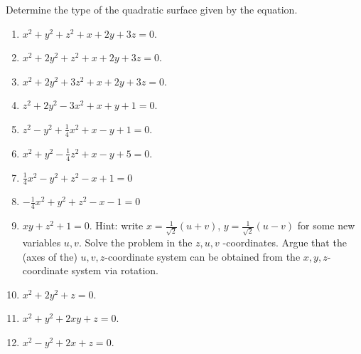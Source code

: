 Determine the type of the quadratic surface given by the equation.
\begin{enumerate}
\item 
$x^2 +y^2+z^2+x+2y+3z=0$.
\item $x^2 +2y^2+z^2+x+2y+3z=0$.
\item $x^2 +2y^2+3z^2+x+2y+3z=0$.
\item \label{problemTypeOfSurfacez^2+2y^2-3x^2+x+y+1=0} $z^2+2y^2-3x^2 + x+y+1=0 $.
\item $z^2-y^2+\frac{1}{4}x^2 + x-y+1=0 $.
\item $x^2+y^2-\frac{1}{4}z^2 + x-y+5=0 $.
\item $\frac{1}{4}x^2-y^2+z^2-x+1=0$
\item $-\frac{1}{4}x^2+y^2+z^2-x-1=0$
\item $xy +z^2+1=0$. Hint: write $x=\frac{1}{\sqrt{2}}(u+v)$, $y=\frac{1}{ \sqrt{ 2} } (u-v) $ for some new variables $u,v$. Solve the problem in the $z,u,v$ -coordinates. Argue that the (axes of the) $u,v,z$-coordinate system can be obtained from the $x,y,z$-coordinate system via rotation.
\item $x^2+2y^2+z=0 $.
\item $x^2+y^2+2xy+z=0 $.
\item $x^2-y^2+2x+z=0 $.
\end{enumerate}